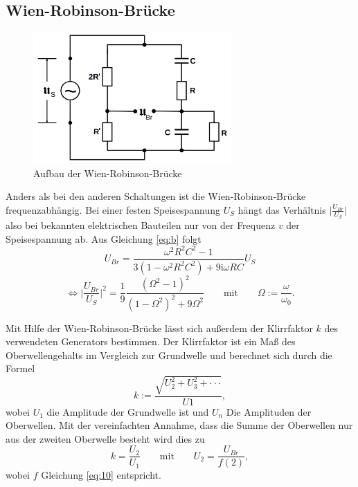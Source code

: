 \subsection{Wien-Robinson-Brücke}
\begin{figure}[H]
\centering
    \includegraphics[height= 5cm]{content/Wien-Robinson.png}
    \caption{Aufbau der Wien-Robinson-Brücke\cite[223]{sample}}
\end{figure}
\noindent Anders als bei den anderen Schaltungen ist
die Wien-Robinson-Brücke frequenzabhängig. Bei einer
festen Speisespannung $U_S$ hängt das Verhältnis
$\lvert{\frac{U_{Br}}{U_S}}\rvert$
also bei bekannten elektrischen Bauteilen
nur von der Frequenz $v$ der Speisespannung ab.
Aus Gleichung \ref{eq:b} folgt
\begin{equation}
    U_{Br}=\frac{\omega^2R^2C^2-1}{3(1-\omega^2R^2C^2)+9\text{i}\omega RC}U_S
\end{equation}
\begin{equation}
    \iff \Big|\frac{U_{Br}}{U_S}\Bigr| ^2=\frac{1}{9}\frac{(\Omega ^2 -1)^2}{(1-\Omega ^2)^2+9\Omega ^2} \qquad \text{mit} \qquad \Omega := \frac{\omega}{\omega_0}.
    \label{eq:10}
\end{equation}

\noindent Mit Hilfe der Wien-Robinson-Brücke lässt
sich außerdem der Klirrfaktor $k$ des verwendeten Generators
bestimmen. Der Klirrfaktor ist ein Maß des
Oberwellengehalts im Vergleich zur Grundwelle und berechnet
sich durch die Formel
\begin{equation}
    k:=\frac{\sqrt{U_2^2+U_3^2+\cdot \cdot \cdot }}{U1},
    \label{eq:11}
   \end{equation}
\noindent wobei $U_1$ die Amplitude der Grundwelle
ist und $U_n$ Die Amplituden der Oberwellen.
Mit der vereinfachten Annahme, dass die Summe der
Oberwellen nur aus der zweiten Oberwelle besteht wird
dies zu
\begin{equation}
    k=\frac{U_2}{U_1} \qquad \text{mit} \qquad U_2=\frac{U_{Br}}{f(2)},
    \label{eq:8}
\end{equation}
\noindent wobei $f$ Gleichung \ref{eq:10} entspricht.



